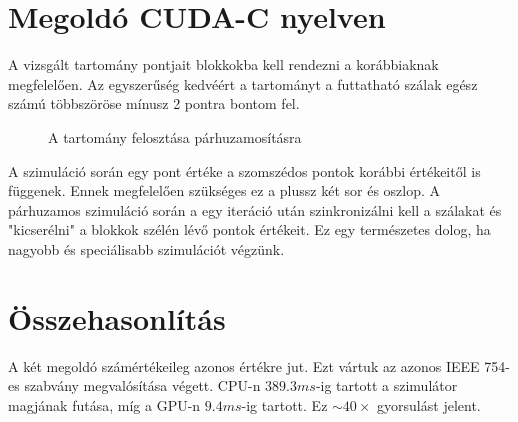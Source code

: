 \section{Megoldó CUDA-C nyelven}
A vizsgált tartomány pontjait blokkokba kell rendezni a korábbiaknak megfelelően.
Az egyszerűség kedvéért a tartományt a futtatható szálak egész számú többszöröse
mínusz 2 pontra bontom fel.
\begin{figure}[H]
\centering
\caption{A tartomány felosztása párhuzamosításra} 
\end{figure}
A szimuláció során egy pont értéke a szomszédos pontok korábbi értékeitől is függenek.
Ennek megfelelően szükséges ez a plussz két sor és oszlop.
A párhuzamos szimuláció során a egy iteráció után szinkronizálni kell a szálakat és "kicserélni"
a blokkok szélén lévő pontok értékeit.
Ez egy természetes dolog, ha nagyobb és speciálisabb szimulációt végzünk.

\section{Összehasonlítás}
A két megoldó számértékeileg azonos értékre jut. Ezt vártuk az azonos IEEE 754-es szabvány
megvalósítása végett. CPU-n $389.3 ms$-ig tartott a szimulátor magjának futása, míg a GPU-n 
$9.4 ms$-ig tartott. Ez $\sim 40 \times$ gyorsulást jelent.
